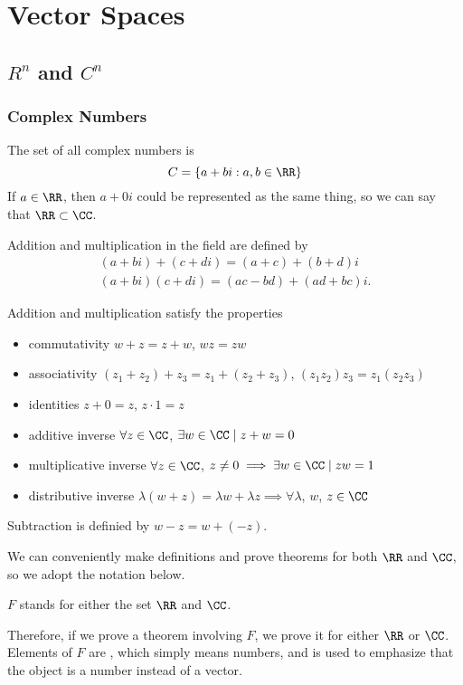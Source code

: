 \chapter{Vector Spaces}

\section{\texorpdfstring{$R^{n}$ and $C^{n}$}{Rn and Cn}}

\subsection{Complex Numbers}

The set of all complex numbers is 
\begin{equation*}
  C = \left\{a + bi : a, b \in \RR\right\}
\end{equation*}
If $a \in \RR$, then $a + 0i$ could be represented as the same thing, so we can say that $\RR \subset \CC$.

Addition and multiplication in the field are defined by
\begin{gather*}
  \left(a + bi\right) + \left(c + di\right) = (a + c) + (b + d)i \\ 
  (a + bi)(c + di) = (ac - bd) + (ad + bc)i.
\end{gather*}

Addition and multiplication satisfy the properties
\begin{itemize}
  \item commutativity \: $w + z = z + w$, $wz = zw$
  \item associativity \; $(z_{1} + z_{2}) + z_{3} = z_{1} + (z_{2} + z_{3})$, $(z_{1}z_{2})z_{3} = z_{1}(z_{2}z_{3})$
  \item identities \; $z + 0 = z$, $z \cdot 1 = z$
  \item additive inverse \; $\forall z \in \CC$, $\exists w \in \CC \mid z + w = 0$
  \item multiplicative inverse \; $\forall z \in \CC$, $z \neq 0 \implies \exists w \in \CC \mid zw = 1$ 
  \item distributive inverse \; $\lambda (w + z) = \lambda w + \lambda z \implies \forall \lambda$, $w$, $z \in \CC$
\end{itemize}

Subtraction is definied by $w - z = w + (-z)$. 

We can conveniently make definitions and prove theorems for both $\RR$ and $\CC$, so we adopt the notation below.
\begin{definition}
  $F$ stands for either the set $\RR$ and $\CC$.
\end{definition}
Therefore, if we prove a theorem involving $F$, we prove it for either $\RR$ or $\CC$.
Elements of $F$ are , which simply means numbers, and is used to emphasize that the object is a number instead of a vector.

